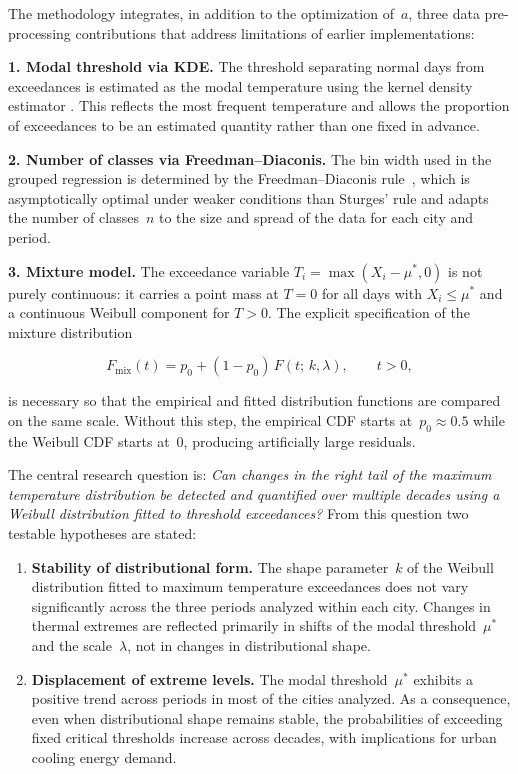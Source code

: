 \documentclass[APA,STIX1COL]{WileyNJD-v2}
\begin{document}
The methodology integrates, in addition to the optimization
of~$a$, three data pre-processing contributions that address
limitations of earlier implementations:

\textbf{1. Modal threshold via KDE.}
The threshold separating normal days from exceedances is
estimated as the modal temperature using the kernel density
estimator \citep{rosenblatt1956,parzen1962}. This reflects the
most frequent temperature and allows the proportion of exceedances
to be an estimated quantity rather than one fixed in advance.

\textbf{2. Number of classes via Freedman--Diaconis.}
The bin width used in the grouped regression is determined by the
Freedman--Diaconis rule~\citeyearpar{freedman1981}, which is
asymptotically optimal under weaker conditions than Sturges' rule
and adapts the number of classes~$n$ to the size and spread of
the data for each city and period.

\textbf{3. Mixture model.}
The exceedance variable $T_i=\max(X_i-\mu^*,0)$ is not purely
continuous: it carries a point mass at $T=0$ for all days with
$X_i\leq\mu^*$ and a continuous Weibull component for $T>0$.
The explicit specification of the mixture distribution

\begin{equation}\label{eq:mezcla_intro}
F_{\mathrm{mix}}(t) = p_0 + (1-p_0)\,F(t;\,k,\lambda),
\qquad t>0,
\end{equation}

is necessary so that the empirical and fitted distribution
functions are compared on the same scale. Without this step, the
empirical CDF starts at~$p_0\approx 0.5$ while the Weibull CDF
starts at~0, producing artificially large residuals.

The central research question is: \textit{Can changes in the right
tail of the maximum temperature distribution be detected and
quantified over multiple decades using a Weibull distribution
fitted to threshold exceedances?}
From this question two testable hypotheses are stated:

\begin{enumerate}
\item[\textbf{H1.}] \textbf{Stability of distributional form.}
  The shape parameter~$k$ of the Weibull distribution fitted to
  maximum temperature exceedances does not vary significantly
  across the three periods analyzed within each city. Changes in
  thermal extremes are reflected primarily in shifts of the modal
  threshold~$\mu^*$ and the scale~$\lambda$, not in changes in
  distributional shape.

\item[\textbf{H2.}] \textbf{Displacement of extreme levels.}
  The modal threshold~$\mu^*$ exhibits a positive trend across
  periods in most of the cities analyzed. As a consequence, even
  when distributional shape remains stable, the probabilities of
  exceeding fixed critical thresholds increase across decades,
  with implications for urban cooling energy demand.
\end{enumerate}
\end{document}
